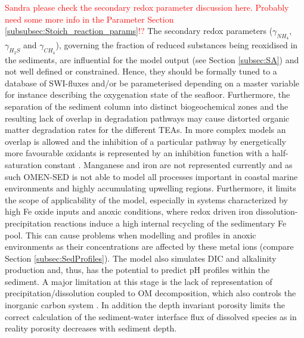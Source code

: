 \documentclass[gmd, manuscript]{copernicus}
\begin{document}
\textcolor{red}{Sandra please check the secondary redox parameter discussion here. Probably need some more info in the Parameter Section \ref{subsubsec:Stoich_reaction_params}!?} 
The secondary redox parameters ($\gamma_{NH_4}$, $\gamma_{H_2S}$ and $\gamma_{CH_4}$), governing the fraction of reduced substances being reoxidised in the sediments, are influential for the model output (see Section \ref{subsec:SA}) and not 
well defined or constrained. Hence, they should be formally tuned to a database of SWI-fluxes and/or be parameterised depending on a master variable for instance describing the oxygenation state of the seafloor. 
Furthermore, the separation of the sediment column into distinct biogeochemical zones and the resulting lack of overlap in degradation pathways may cause distorted organic matter degradation rates for the different TEAs. 
In more complex models an overlap is allowed and the inhibition of a particular pathway by energetically more favourable oxidants is represented by an inhibition function with a half-saturation constant 
\citep[see e.g.][]{boudreau_method--lines_1996, meysman_reactive_2003, aguilera_knowledge-based_2005}.
Manganese and iron are not represented currently and as such OMEN-SED is not able to model all processes important in coastal marine environments and highly accumulating upwelling regions. Furthermore, it 
limits the scope of applicability of the model, especially in systems characterized by high Fe oxide inputs and anoxic conditions, where redox driven iron dissolution-precipitation reactions induce a high internal recycling of the sedimentary Fe pool. 
This can cause problems when modelling  and  profiles in anoxic environments as their concentrations are affected by these metal ions (compare Section \ref{subsec:SedProfiles}). 
The model also simulates DIC and alkalinity production and, thus, has the potential to predict pH profiles within the sediment.
A major limitation at this stage is the lack of representation of  precipitation/dissolution coupled to OM decomposition, which also controls the inorganic carbon system  \citep{krumins_dissolved_2013}. 
In addition the depth invariant porosity limits the correct calculation of the sediment-water interface flux of dissolved species as in reality porosity decreases with sediment depth. 
\end{document}
